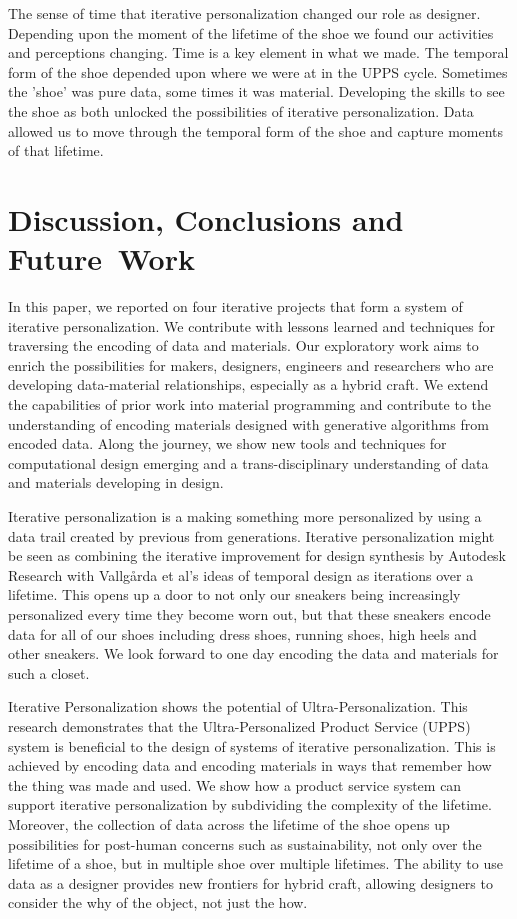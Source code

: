 The sense of time that iterative personalization changed our role as designer. Depending upon the moment of the lifetime of the shoe we found our activities and perceptions changing. Time is a key element in what we made. The temporal form of the shoe depended upon where we were at in the UPPS cycle. Sometimes the 'shoe' was pure data, some times it was material. Developing the skills to see the shoe as both unlocked the possibilities of iterative personalization. Data allowed us to move through the temporal form of the shoe and capture moments of that lifetime. 

\section{Discussion, Conclusions and Future~Work}
In this paper, we reported on four iterative projects that form a system of iterative personalization. We contribute with lessons learned and techniques for traversing the encoding of data and materials. Our exploratory work aims to enrich the possibilities for makers, designers, engineers and researchers who are developing data-material relationships, especially as a hybrid craft. We extend the capabilities of prior work into material programming \cite{Vallgarda2016} and contribute to the understanding of encoding materials designed with generative algorithms from encoded data. Along the journey, we show new tools and techniques for computational design emerging and a trans-disciplinary understanding of data and materials developing in design. 

Iterative personalization is a making something more personalized by using a data trail created by previous from generations. Iterative personalization might be seen as combining the iterative improvement for design synthesis by Autodesk Research \cite{Nourbakhsh2016} with Vallg\aa rda et al's ideas of temporal design \cite{Vallgarda2015} as iterations over a lifetime.  This opens up a door to not only our sneakers being increasingly personalized every time they become worn out, but that these sneakers encode data for all of our shoes including dress shoes, running shoes, high heels and other sneakers. We look forward to one day encoding the data and materials for such a closet. 

Iterative Personalization shows the potential of Ultra-Personalization. 
This research demonstrates that the Ultra-Personalized Product Service (UPPS) system is beneficial to the design of systems of iterative personalization. This is achieved by encoding data and encoding materials in ways that remember how the thing was made and used. We show how a product service system can support iterative personalization by subdividing the complexity of the lifetime. Moreover, the collection of data across the lifetime of the shoe opens up possibilities for  post-human concerns such as sustainability, not only over the lifetime of a shoe, but in multiple shoe over multiple lifetimes. The ability to use data as a designer provides new frontiers for hybrid craft, allowing designers to consider the why of the object, not just the how. 

